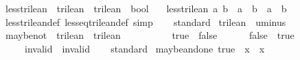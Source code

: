 \begin{isabellebody}
\isanewline
{}\isamarkupfalse%
\ less{\isacharunderscore}trilean\ {\isacharcolon}{\isacharcolon}\ {\isachardoublequoteopen}trilean\ {\isasymRightarrow}\ trilean\ {\isasymRightarrow}\ bool{\isachardoublequoteclose}\ \isanewline
\ \ {\isachardoublequoteopen}less{\isacharunderscore}trilean\ a\ b\ {\isacharequal}\ {\isacharparenleft}a\ {\isasymle}\ b\ {\isasymand}\ a\ {\isasymnoteq}\ b{\isacharparenright}{\isachardoublequoteclose}\isanewline
\isanewline
{}\isamarkupfalse%
\ less{\isacharunderscore}trilean{\isacharunderscore}def\ less{\isacharunderscore}eq{\isacharunderscore}trilean{\isacharunderscore}def\ {\isacharbrackleft}simp{\isacharbrackright}\isanewline
\isanewline
{}\isamarkupfalse%
\isanewline
%
\isadelimproof
\ \ %
\endisadelimproof
%
\isatagproof
{}\isamarkupfalse%
\ standard%
\endisatagproof
{\isafoldproof}%
%
\isadelimproof
\isanewline
%
\endisadelimproof
{}\isamarkupfalse%
\isanewline
\isanewline
{}\isamarkupfalse%
\ trilean\ {\isacharcolon}{\isacharcolon}\ uminus\ \isanewline
\ \ \isamarkupfalse%
\ maybe{\isacharunderscore}not\ {\isacharcolon}{\isacharcolon}\ {\isachardoublequoteopen}trilean\ {\isasymRightarrow}\ trilean{\isachardoublequoteclose}\ {\isacharparenleft}{\isachardoublequoteopen}{\isasymnot}\isactrlsub {\isacharquery}\ {\isacharunderscore}{\isachardoublequoteclose}\ {\isacharbrackleft}{}{}{\isacharbrackright}\ {}{}{\isacharparenright}\ \isanewline
\ \ \ \ {\isachardoublequoteopen}{\isasymnot}\isactrlsub {\isacharquery}\ true\ {\isacharequal}\ false{\isachardoublequoteclose}\ {\isacharbar}\isanewline
\ \ \ \ {\isachardoublequoteopen}{\isasymnot}\isactrlsub {\isacharquery}\ false\ {\isacharequal}\ true{\isachardoublequoteclose}\ {\isacharbar}\isanewline
\ \ \ \ {\isachardoublequoteopen}{\isasymnot}\isactrlsub {\isacharquery}\ invalid\ {\isacharequal}\ invalid{\isachardoublequoteclose}\isanewline
\isanewline
{}\isamarkupfalse%
\isanewline
%
\isadelimproof
\ \ %
\endisadelimproof
%
\isatagproof
{}\isamarkupfalse%
\ standard%
\endisatagproof
{\isafoldproof}%
%
\isadelimproof
\isanewline
%
\endisadelimproof
{}\isamarkupfalse%
\isanewline
\isanewline
{}\isamarkupfalse%
\ maybe{\isacharunderscore}and{\isacharunderscore}one{\isacharcolon}\ {\isachardoublequoteopen}true\ {\isasymand}\isactrlsub {\isacharquery}\ x\ {\isacharequal}\ x{\isachardoublequoteclose}\isanewline

\end{isabellebody}
